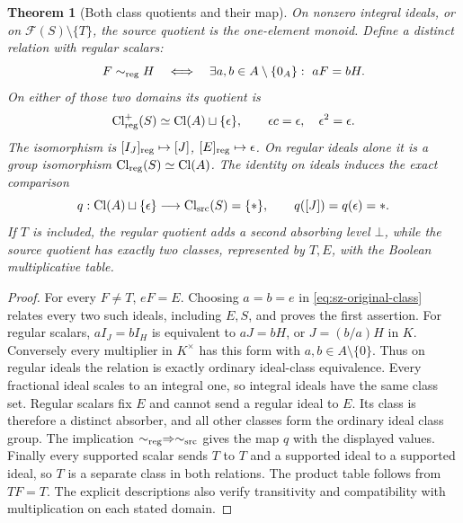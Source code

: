 \documentclass[11pt,a4paper]{article}
\newtheorem{theorem}{Theorem}[section]
\theoremstyle{definition}\newtheorem{definition}[theorem]{Definition}
\begin{document}
\begin{theorem}[Both class quotients and their map]\label{thm:sz-class-comparison}
On nonzero integral ideals, or on \(\mathcal F(S)\setminus\{T\}\),
the source quotient is the one-element monoid.
Define a distinct relation with regular scalars:
\begin{equation}\label{eq:sz-regular-class}
 F\sim_{\rm reg}H\quad\Longleftrightarrow\quad
 \exists a,b\in A\setminus\{0_A\}:\ aF=bH .
\end{equation}
On either of those two domains its quotient is
\begin{equation}\label{eq:sz-regular-class-monoid}
 \mathrm{Cl}_{\rm reg}^{+}(S)\simeq\mathrm{Cl}(A)\sqcup\{\epsilon\},
 \qquad \epsilon c=\epsilon,\quad\epsilon^2=\epsilon.
\end{equation}
The isomorphism is \([I_J]_{\rm reg}\mapsto[J]\),
\([E]_{\rm reg}\mapsto\epsilon\).
On regular ideals alone it is a group isomorphism
\(\mathrm{Cl}_{\rm reg}(S)\simeq\mathrm{Cl}(A)\).
The identity on ideals induces the exact comparison
\begin{equation}\label{eq:sz-class-forget}
 q:\mathrm{Cl}(A)\sqcup\{\epsilon\}
 \longrightarrow\mathrm{Cl}_{\rm src}(S)=\{*\},\qquad
 q([J])=q(\epsilon)=* .
\end{equation}
If \(T\) is included, the regular quotient adds a second absorbing
level \(\bot\), while the source quotient has exactly two classes,
represented by \(T,E\), with the Boolean multiplicative table.
\end{theorem}
\begin{proof}
For every \(F\ne T\), \(eF=E\). Choosing \(a=b=e\) in
\eqref{eq:sz-original-class} relates every two such ideals,
including \(E,S\), and proves the first assertion.
For regular scalars, \(aI_J=bI_H\) is equivalent to \(aJ=bH\),
or \(J=(b/a)H\) in \(K\). Conversely every multiplier in \(K^\times\)
has this form with \(a,b\in A\setminus\{0\}\). Thus on regular
ideals the relation is exactly ordinary ideal-class equivalence.
Every fractional ideal scales to an integral one, so integral ideals
have the same class set. Regular scalars fix \(E\) and cannot send
a regular ideal to \(E\). Its class is therefore a distinct
absorber, and all other classes form the ordinary ideal class group.
The implication \(\sim_{\rm reg}\Rightarrow\sim_{\rm src}\) gives
the map \(q\) with the displayed values.
Finally every supported scalar sends \(T\) to \(T\) and a supported
ideal to a supported ideal, so \(T\) is a separate class in both
relations. The product table follows from \(TF=T\).
The explicit descriptions also verify transitivity and compatibility
with multiplication on each stated domain.
\end{proof}
\end{document}

